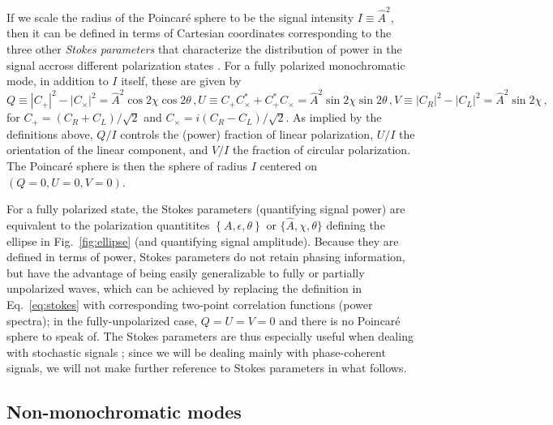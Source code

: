 \documentclass[aps,prd,twocolumn,superscriptaddress,preprintnumbers,floatfix,nofootinbib]{revtex4-2}
\newcommand{\beq}{\begin{equation}}
\newcommand{\eeq}{\end{equation}}
\newcommand*{\eq}[1]{Eq.~\eqref{eq:#1}}
\begin{document}
If we scale the radius of the Poincar\'{e} sphere to be the signal intensity $I \equiv \hat{A}^2$, then it can be defined in terms of Cartesian coordinates corresponding to the three other \emph{Stokes parameters} that characterize the distribution of power in the signal accross different polarization states \cite{Anile1974}.
For a fully polarized monochromatic mode, in addition to $I$ itself, these are given by
\begin{subequations} \label{eq:stokes}
\beq
Q \equiv |C_+|^2 - |C_\times|^2 = \hat{A}^2 \cos 2\chi \cos 2\theta \, , 
\eeq
\beq
U \equiv C_+ C_\times^* + C_+^* C_\times = \hat{A}^2 \sin2\chi \sin 2\theta \,  ,
\eeq
\beq
V \equiv |C_R|^2 - |C_L|^2 = \hat{A}^2 \sin 2\chi \, ,
\eeq 
\end{subequations}
for $C_+ = (C_R + C_L)/\sqrt{2}$ and $C_\times = i (C_R - C_L)/\sqrt{2}$.
As implied by the definitions above, $Q/I$ controls the (power) fraction of linear polarization, $U/I$ the orientation of the linear component, and $V/I$ the fraction of circular polarization.
The Poincar\'{e} sphere is then the sphere of radius $I$ centered on $\left(Q=0, U=0, V=0\right)$.

For a fully polarized state, the Stokes parameters (quantifying signal power) are equivalent to the polarization quantitites $\left\{A, \epsilon, \theta\right\}$ or $\{\hat{A}, \chi, \theta\}$ defining the ellipse in Fig.~\ref{fig:ellipse} (and quantifying signal amplitude).
Because they are defined in terms of power, Stokes parameters do not retain phasing information, but have the advantage of being easily generalizable to fully or partially unpolarized waves, which can be achieved by replacing the definition in Eq.~\eqref{eq:stokes} with corresponding two-point correlation functions (power spectra); in the fully-unpolarized case, $Q=U=V=0$ and there is no Poincar\'{e} sphere to speak of.
The Stokes parameters are thus especially useful when dealing with stochastic signals \cite{Romano:2016dpx,Conneely:2018wis,Seto:2008sr,Kato:2015bye}; since we will be dealing mainly with phase-coherent signals, we will not make further reference to Stokes parameters in what follows.


\subsection{Non-monochromatic modes}
\label{sec:ellip:gen}
\end{document}
